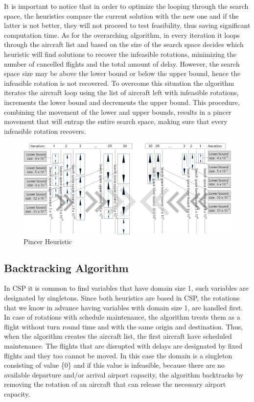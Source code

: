 It is important to notice that in order to optimize the looping through the search space, the heuristics compare the current solution with the new one and if the latter is not better, they will not proceed to test feasibility, thus saving significant computation time. 
As for the overarching algorithm, in every iteration it loops through the aircraft list and based on the size of the search space decides which heuristic will find solutions to recover the infeasible rotations, minimizing the number of cancelled flights and the total amount of delay. However, the search space size may be above the lower bound or below the upper bound, hence the infeasible rotation is not recovered. To overcome this situation the algorithm iterates the aircraft loop using the list of aircraft left with infeasible rotations, increments the lower bound %
and decrements the upper bound. %
  This procedure, combining the movement of the lower and upper bounds, results in a pincer movement that will entrap the entire search space, making sure that every infeasible rotation recovers.\\
 
 \begin{figure}[h!]
 	\centering
 	\includegraphics[scale=0.45]{figures/pincer.png}
 	\caption[]{Pincer Heuristic}
 	\label{fig:pincer}
 \end{figure}
%
%
\subsection{Backtracking Algorithm} \label{sec:backtracking}

In CSP it is common to find variables that have domain size 1, such variables are designated by singletons. Since both heuristics are based in CSP, the rotations that we know in advance having variables with domain size 1, are handled first. In case of rotations with schedule maintenance, the algorithm treats them as a flight without turn round time and with the same origin and destination.  Thus, when the algorithm creates the aircraft list, the first aircraft have scheduled maintenance. The flights that are disrupted with delays are designated by fixed flights and they too cannot be moved. In this case the domain is a singleton consisting of value \{0\} and if this value is infeasible, because there are no available departure and/or arrival airport capacity, the algorithm backtracks by removing the rotation of an aircraft that can release the necessary airport capacity.


